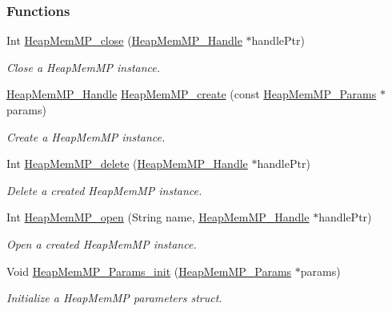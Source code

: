 \subsubsection*{Functions}
\begin{DoxyCompactItemize}
\item 
Int \hyperlink{_heap_mem_m_p_8h_ac3fcc6ef980577f060f738f3485013f1}{HeapMemMP\_\-close} (\hyperlink{_heap_mem_m_p_8h_a9aa6360e22c2f5f387c5aba52a1a8522}{HeapMemMP\_\-Handle} $\ast$handlePtr)
\begin{DoxyCompactList}\small\item\em Close a HeapMemMP instance. \item\end{DoxyCompactList}\item 
\hyperlink{_heap_mem_m_p_8h_a9aa6360e22c2f5f387c5aba52a1a8522}{HeapMemMP\_\-Handle} \hyperlink{_heap_mem_m_p_8h_a3ee79b7e84e8eaef048c919be45e0a7c}{HeapMemMP\_\-create} (const \hyperlink{struct_heap_mem_m_p___params}{HeapMemMP\_\-Params} $\ast$params)
\begin{DoxyCompactList}\small\item\em Create a HeapMemMP instance. \item\end{DoxyCompactList}\item 
Int \hyperlink{_heap_mem_m_p_8h_a0041a019dcc514bf6de66997a3383a02}{HeapMemMP\_\-delete} (\hyperlink{_heap_mem_m_p_8h_a9aa6360e22c2f5f387c5aba52a1a8522}{HeapMemMP\_\-Handle} $\ast$handlePtr)
\begin{DoxyCompactList}\small\item\em Delete a created HeapMemMP instance. \item\end{DoxyCompactList}\item 
Int \hyperlink{_heap_mem_m_p_8h_a05598b30cd1a93e88e59cea962d1e976}{HeapMemMP\_\-open} (String name, \hyperlink{_heap_mem_m_p_8h_a9aa6360e22c2f5f387c5aba52a1a8522}{HeapMemMP\_\-Handle} $\ast$handlePtr)
\begin{DoxyCompactList}\small\item\em Open a created HeapMemMP instance. \item\end{DoxyCompactList}\item 
Void \hyperlink{_heap_mem_m_p_8h_ade4b085199639e1184e221725e03a962}{HeapMemMP\_\-Params\_\-init} (\hyperlink{struct_heap_mem_m_p___params}{HeapMemMP\_\-Params} $\ast$params)
\begin{DoxyCompactList}\small\item\em Initialize a HeapMemMP parameters struct. \item\end{DoxyCompactList}\item 

\end{DoxyCompactItemize}
